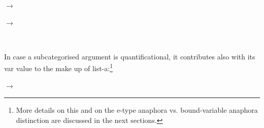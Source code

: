 \documentclass[output=paper
,modfonts
,nonflat]{langsci/langscibook}
\begin{document}
 \begin{samepage}
\begin{exe}
\ex\label{lexconst}
\end{exe}

\avmfont{\sc}
\avmvalfont{\it}
\begin{avm}
\hfill
{}
\end{avm}
\begin{flushright}
$\longrightarrow$
\begin{avm}
\hfill
{}
\end{avm}
\end{flushright}

\begin{avm}
\hfill
{}
\end{avm}
\begin{flushright}
$\longrightarrow$
\begin{avm}
\hfill
{}
\end{avm}
\\

\end{flushright}
\end{samepage}

In case a subcategorised argument is quantificational, 
it contributes also with its {\sc var} value to the make up of
{\sc list-a}:\footnote{
More details on this and on the
e-type anaphora vs. bound-variable anaphora distinction are discussed
in the next sections.}

\begin{exe}
\ex\label{lexconst2}
\end{exe}

\avmfont{\sc}
\avmvalfont{\it}
\begin{avm}
\hfill
{}
\end{avm}
\begin{flushright}
$\longrightarrow$
\begin{avm}
\end{avm}
\end{flushright}
\avmoptions{}
\end{document}
